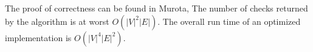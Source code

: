 \documentclass{article}
\begin{document}
The proof of correctness can be found in Murota\cite{commutative}, 
The number of checks returned by the algorithm is at worst $O(|V|^2|E|)$. The overall run time of an optimized implementation is $O(|V|^4|E|^2)$.



\end{document}
